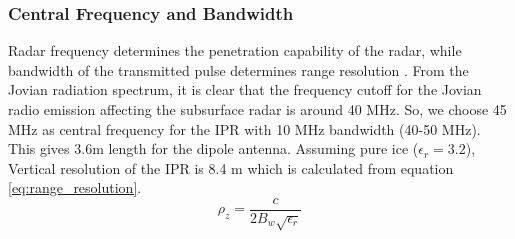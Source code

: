 \subsubsection{Central Frequency and Bandwidth}
Radar frequency determines the penetration capability of the radar, while bandwidth of the transmitted pulse determines range resolution \cite{penetrartion}. From the Jovian radiation spectrum, it is clear that the frequency cutoff for the Jovian radio
emission affecting the subsurface radar is around 40 MHz. So, we choose 45 MHz as central frequency for the \ac{IPR} with 10 MHz bandwidth (40-50 MHz). This gives 3.6m length for the dipole antenna. Assuming pure ice ($\epsilon_{r} = 3.2$), Vertical resolution of the \ac{IPR} is 8.4 m which is calculated from equation \ref{eq:range_resolution}.
%
\begin{equation}
\rho_{z} = \dfrac{c}{2B_{w}\sqrt{\epsilon_{r}}}
\label{eq:range_resolution}
\end{equation}
%
